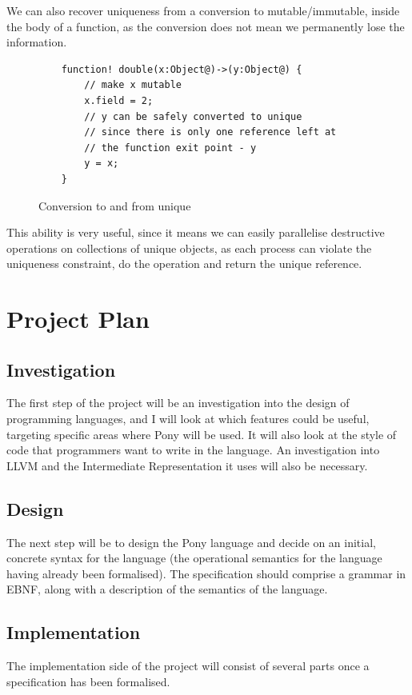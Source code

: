 \documentclass[11pt,a4paper]{report}
\begin{document}
We can also recover uniqueness from a conversion to mutable/immutable, inside the body of a function, as the conversion does not mean we permanently lose the information.

\begin{figure}[H]
\begin{verbatim}
    function! double(x:Object@)->(y:Object@) {
        // make x mutable
        x.field = 2;
        // y can be safely converted to unique
        // since there is only one reference left at
        // the function exit point - y
        y = x;
    }
\end{verbatim}
\caption{Conversion to and from unique}
\end{figure}

This ability is very useful, since it means we can easily parallelise destructive operations on collections of unique objects, as each process can violate the uniqueness constraint, do the operation and return the unique reference.

\newpage
\chapter{Project Plan}
\label{chapter:project}

\section{Investigation}
The first step of the project will be an investigation into the design of programming languages, and I will look at which features could be useful, targeting specific areas where Pony will be used.
It will also look at the style of code that programmers want to write in the language.
An investigation into LLVM and the Intermediate Representation it uses will also be necessary.

\section{Design}
The next step will be to design the Pony language and decide on an initial, concrete syntax for the language (the operational semantics for the language having already been formalised).
The specification should comprise a grammar in EBNF, along with a description of the semantics of the language.

\section{Implementation}
The implementation side of the project will consist of several parts once a specification has been formalised.
\end{document}
